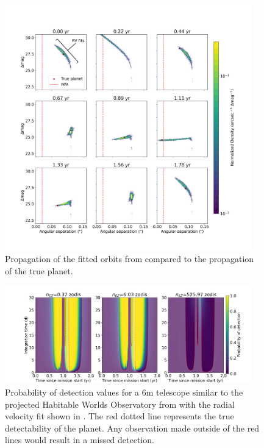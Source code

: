 \begin{figure}
  \begin{center}
    \includegraphics[width=0.95\textwidth]{ch3/figures/pop_propagation_in_time.png}
  \end{center}
  \caption{Propagation of the fitted orbits from  compared to the propagation
  of the true planet.}
  \label{fig:pop_propagation_in_time}
\end{figure}

\begin{figure}
  \begin{center}
    \includegraphics[width=0.95\textwidth]{ch3/figures/pdet_colored_true_overlay.png}
  \end{center}
  \caption{Probability of detection values for a 6m telescope similar to the
  projected Habitable Worlds Observatory from \citet{morganExplorationExpectedNumber2022a}
  with the radial velocity fit shown in . The
red dotted line represents the true detectability of the planet. Any
observation made outside of the red lines would result in a missed detection.}
  \label{fig:pdet_colored_true_overlay}
\end{figure}

